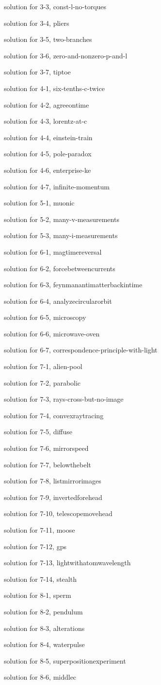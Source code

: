 \documentclass{problems}
\begin{document}
solution for 3-3, const-l-no-torques

solution for 3-4, pliers

solution for 3-5, two-branches

solution for 3-6, zero-and-nonzero-p-and-l

solution for 3-7, tiptoe

solution for 4-1, six-tenths-c-twice

solution for 4-2, agreeontime

solution for 4-3, lorentz-at-c

solution for 4-4, einstein-train

solution for 4-5, pole-paradox

solution for 4-6, enterprise-ke

solution for 4-7, infinite-momentum

solution for 5-1, muonic

solution for 5-2, many-v-measurements

solution for 5-3, many-i-measurements

solution for 6-1, magtimereversal

solution for 6-2, forcebetweencurrents

solution for 6-3, feynmanantimatterbackintime

solution for 6-4, analyzecircularorbit

solution for 6-5, microscopy

solution for 6-6, microwave-oven

solution for 6-7, correspondence-principle-with-light

solution for 7-1, alien-pool

solution for 7-2, parabolic

solution for 7-3, rays-cross-but-no-image

solution for 7-4, convexraytracing

solution for 7-5, diffuse

solution for 7-6, mirrorspeed

solution for 7-7, belowthebelt

solution for 7-8, listmirrorimages

solution for 7-9, invertedforehead

solution for 7-10, telescopemovehead

solution for 7-11, moose

solution for 7-12, gps

solution for 7-13, lightwithatomwavelength

solution for 7-14, stealth

solution for 8-1, sperm

solution for 8-2, pendulum

solution for 8-3, alterations

solution for 8-4, waterpulse

solution for 8-5, superpositionexperiment

solution for 8-6, middlec

    
    
\end{document}
